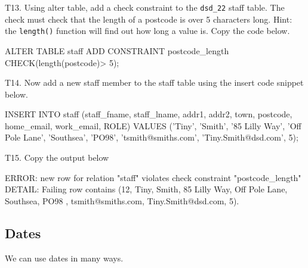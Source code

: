 T13. Using alter table, add a check constraint to the \verb|dsd_22| staff table. The check must check that the length of a postcode is over 5 characters long. Hint: the \verb|length()| function will find out how long a value is. Copy the code below.
\begin{sql}
ALTER TABLE staff ADD CONSTRAINT postcode_length CHECK(length(postcode)> 5);
\end{sql}

T14. Now add a new staff member to the staff table using the insert code snippet below.
\begin{sql}
INSERT INTO staff (staff_fname, staff_lname, addr1, addr2, town, postcode, home_email, work_email, ROLE)
VALUES ('Tiny',
        'Smith',
        '85 Lilly Way',
        'Off Pole Lane',
        'Southsea',
        'PO98',
        'tsmith@smiths.com',
        'Tiny.Smith@dsd.com',
        5);
\end{sql}
T15. Copy the output below
\begin{pseudo}
ERROR:  new row for relation "staff" violates check constraint "postcode_length"
DETAIL:  Failing row contains (12, Tiny, Smith, 85 Lilly Way, Off Pole Lane, Southsea, PO98     , tsmith@smiths.com, Tiny.Smith@dsd.com, 5).
\end{pseudo}

\subsection*{Dates}
We can use dates in many ways.

